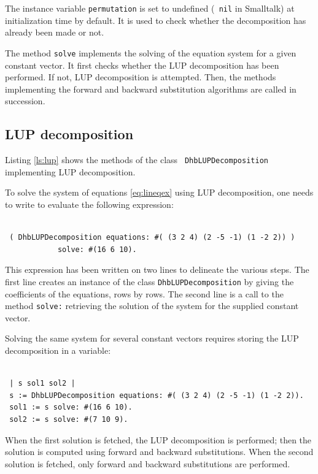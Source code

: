 \documentclass[twoside]{book}
\begin{document}
The instance variable {\tt permutation} is set to undefined ({\tt
nil} in Smalltalk) at initialization time by
default. It is used to check whether the decomposition has already
been made or not.

The method {\tt solve} implements the solving of the equation
system for a given constant vector. It first checks whether the
LUP decomposition has been performed. If not, LUP decomposition is
attempted. Then, the methods implementing the forward and backward
substitution algorithms are called in succession.

\subsection{LUP decomposition}
Listing \ref{ls:lup} shows the methods of the class {\tt
DhbLUPDecomposition} implementing LUP decomposition.

To solve the system of equations \ref{eq:lineqex} using LUP
decomposition, one needs to write to evaluate the following
expression:
\begin{codeExample}
\begin{verbatim}

 ( DhbLUPDecomposition equations: #( (3 2 4) (2 -5 -1) (1 -2 2)) )
            solve: #(16 6 10).
\end{verbatim}
\end{codeExample}
This expression has been written on two lines to delineate the
various steps. The first line creates an instance of the class
{\tt DhbLUPDecomposition} by giving the coefficients of the
equations, rows by rows. The second line is a call to the method
{\tt solve:} retrieving the solution of the system for the
supplied constant vector.

Solving the same system for several constant vectors requires
storing the LUP decomposition in a variable:
\begin{codeExample}
\begin{verbatim}

 | s sol1 sol2 |
 s := DhbLUPDecomposition equations: #( (3 2 4) (2 -5 -1) (1 -2 2)).
 sol1 := s solve: #(16 6 10).
 sol2 := s solve: #(7 10 9).
\end{verbatim}
\end{codeExample}
When the first solution is fetched, the LUP decomposition is
performed; then the solution is computed using forward and
backward substitutions. When the second solution is fetched, only
forward and backward substitutions are performed.
\end{document}
